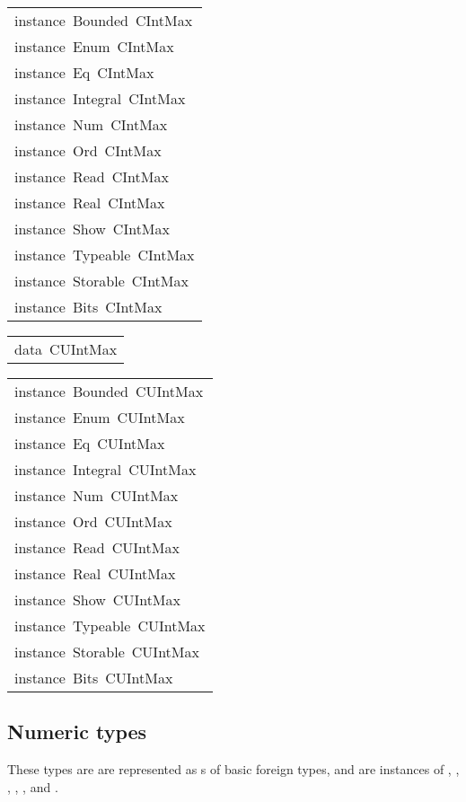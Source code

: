 \begin{haddockdesc}
\item[\begin{tabular}{@{}l}
instance\ Bounded\ CIntMax\\instance\ Enum\ CIntMax\\instance\ Eq\ CIntMax\\instance\ Integral\ CIntMax\\instance\ Num\ CIntMax\\instance\ Ord\ CIntMax\\instance\ Read\ CIntMax\\instance\ Real\ CIntMax\\instance\ Show\ CIntMax\\instance\ Typeable\ CIntMax\\instance\ Storable\ CIntMax\\instance\ Bits\ CIntMax
\end{tabular}]
\end{haddockdesc}
\begin{haddockdesc}
\item[\begin{tabular}{@{}l}
data\ CUIntMax
\end{tabular}]
\end{haddockdesc}
\begin{haddockdesc}
\item[\begin{tabular}{@{}l}
instance\ Bounded\ CUIntMax\\instance\ Enum\ CUIntMax\\instance\ Eq\ CUIntMax\\instance\ Integral\ CUIntMax\\instance\ Num\ CUIntMax\\instance\ Ord\ CUIntMax\\instance\ Read\ CUIntMax\\instance\ Real\ CUIntMax\\instance\ Show\ CUIntMax\\instance\ Typeable\ CUIntMax\\instance\ Storable\ CUIntMax\\instance\ Bits\ CUIntMax
\end{tabular}]
\end{haddockdesc}
\subsection{Numeric types
}
These types are are represented as s of basic
 foreign types, and are instances of
 , , , ,
 ,  and .
\par

